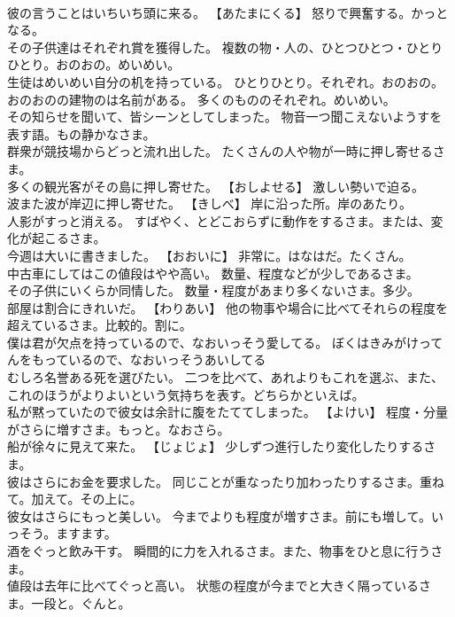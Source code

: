 \documentclass[8pt]{extreport}
\begin{document}
\begin{CJK}{UTF8}{min}
\\	彼の言うことはいちいち頭に来る。	【あたまにくる】 怒りで興奮する。かっとなる。
\\	その子供達はそれぞれ賞を獲得した。	複数の物・人の、ひとつひとつ・ひとりひとり。おのおの。めいめい。
\\	生徒はめいめい自分の机を持っている。	ひとりひとり。それぞれ。おのおの。
\\	おのおのの建物のは名前がある。	多くのもののそれぞれ。めいめい。
\\	その知らせを聞いて、皆シーンとしてしまった。	物音一つ聞こえないようすを表す語。もの静かなさま。
\\	群衆が競技場からどっと流れ出した。	たくさんの人や物が一時に押し寄せるさま。
\\	多くの観光客がその島に押し寄せた。	【おしよせる】 激しい勢いで迫る。
\\	波また波が岸辺に押し寄せた。	【きしべ】 岸に沿った所。岸のあたり。
\\	人影がすっと消える。	すばやく、とどこおらずに動作をするさま。または、変化が起こるさま。
\\	今週は大いに書きました。	【おおいに】 非常に。はなはだ。たくさん。
\\	中古車にしてはこの値段はやや高い。	数量、程度などが少しであるさま。
\\	その子供にいくらか同情した。	数量・程度があまり多くないさま。多少。
\\	部屋は割合にきれいだ。	【わりあい】 他の物事や場合に比べてそれらの程度を超えているさま。比較的。割に。
\\	僕は君が欠点を持っているので、なおいっそう愛してる。	ぼくはきみがけってんをもっているので、なおいっそうあいしてる 
\\	むしろ名誉ある死を選びたい。	二つを比べて、あれよりもこれを選ぶ、また、これのほうがよりよいという気持ちを表す。どちらかといえば。
\\	私が黙っていたので彼女は余計に腹をたててしまった。	【よけい】 程度・分量がさらに増すさま。もっと。なおさら。
\\	船が徐々に見えて来た。	【じょじょ】 少しずつ進行したり変化したりするさま。
\\	彼はさらにお金を要求した。	同じことが重なったり加わったりするさま。重ねて。加えて。その上に。
\\	彼女はさらにもっと美しい。	今までよりも程度が増すさま。前にも増して。いっそう。ますます。
\\	酒をぐっと飲み干す。	瞬間的に力を入れるさま。また、物事をひと息に行うさま。
\\	値段は去年に比べてぐっと高い。	状態の程度が今までと大きく隔っているさま。一段と。ぐんと。

\end{CJK}
\end{document}
